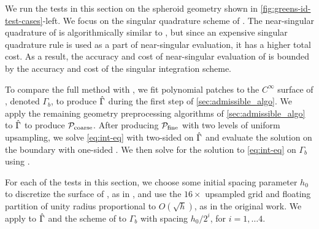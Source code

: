 We run the tests in this section on the spheroid geometry shown in \cref{fig:greens-id-test-cases}-left.
We focus on the singular quadrature scheme of \cite{YBZ}. 
The near-singular quadrature of \cite{YBZ} is algorithmically similar to \qbkix, but since an expensive singular quadrature rule is used as a part of near-singular evaluation, it has a higher total cost.
As a result, the accuracy and cost of near-singular evaluation of \cite{YBZ} is bounded by the accuracy and cost of the singular integration scheme.

To compare the full \qbkix method with \cite{YBZ}, we fit polynomial patches to the $C^\infty$ surface of \cite{ying2004simple}, denoted $\Gamma_b$, to produce $\hat{\Gamma}$ during the first step of \cref{sec:admissible_algo}.
We apply the remaining geometry preprocessing algorithms of \cref{sec:admissible_algo} to $\hat{\Gamma}$ to produce ${\mathcal{P}_{\mathrm{coarse}}}$.
After producing ${\mathcal{P}_{\mathrm{fine}}}$ with two levels of uniform upsampling, we solve \cref{eq:int-eq} with two-sided \qbkix on $\hat{\Gamma}$ and evaluate the solution on the boundary with one-sided \qbkix.
We then solve for the solution to \cref{eq:int-eq} on $\Gamma_b$ using \cite{YBZ}. 

For each of the tests in this section, we choose some initial spacing parameter
$h_0$ to discretize the surface of \cite{ying2004simple}, as in \cite{YBZ}, and use the $16\times$ upsampled grid and floating partition of unity radius proportional to $O(\sqrt{h})$, as in the original work.
We apply \qbkix to $\hat{\Gamma}$ and the scheme of \cite{YBZ} to $\Gamma_b$ with spacing $h_0/2^i$, for $i=1,\hdots 4$.

